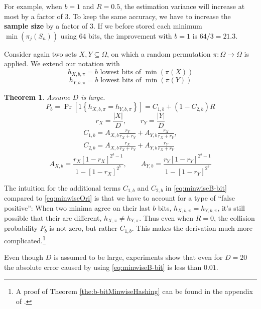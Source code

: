 \documentclass[a4paper]{article}
\newtheorem{mytheorem}{Theorem}
\begin{document}
For example, when $b=1$ and $R=0.5$, the estimation variance will increase at most by a factor of $3$. To keep the same accuracy, we have to increase the \textbf{sample size} by a factor of $3$. If we before stored each minimum $\min(\pi_j(S_n))$ using $64$ bits, the improvement with $b=1$ is $64/3=21.3$.

Consider again two sets $X,Y \subseteq \Omega$, on which a random permutation $\pi: \Omega \longrightarrow \Omega$ is applied. We extend our notation with
\[
h_{X,b,\pi}=b \text{ lowest bits of } \min(\pi(X))
\]
\[
h_{Y,b,\pi}=b \text{ lowest bits of } \min(\pi(Y))
\]
\begin{framed}
\begin{mytheorem} \label{the:b-bitMinwiseHashing}
Assume $D$ is large.
\begin{equation}\label{eq:minwiseB-bit}
P_b=\Pr[1\left\lbrace h_{X,b,\pi}=h_{Y,b,\pi}\right\rbrace]=C_{1,b}+(1-C_{2,b})R
\end{equation}
\begin{equation}
r_X=\frac{|X|}{D}, \qquad r_Y=\frac{|Y|}{D}
\end{equation}
\begin{equation}
\begin{split}
C_{1,b}=A_{X,b}\frac{r_Y}{r_X+r_Y}+A_{Y,b}\frac{r_X}{r_X+r_Y},\\
C_{2,b}=A_{X,b}\frac{r_X}{r_X+r_Y}+A_{Y,b}\frac{r_Y}{r_X+r_Y}
\end{split}
\end{equation}
\begin{equation}
A_{X,b}=\frac{r_X[1-r_X]^{2^b-1}}{1-[1-r_X]^{2^b}}, \qquad A_{Y,b}=\frac{r_Y[1-r_Y]^{2^b-1}}{1-[1-r_Y]^{2^b}}
\end{equation}
\end{mytheorem}
\end{framed}

The intuition for the additional terms $C_{1,b}$ and $C_{2,b}$ in \vref{eq:minwiseB-bit} compared to \vref{eq:minwiseOri} is that we have to account for a type of ``false positive'': When two minima agree on their last $b$ bits, $h_{X,b,\pi}=h_{Y,b,\pi}$, it's still possible that their are different, $h_{X,\pi}\neq h_{Y,\pi}$. Thus even when $R=0$, the collision probability $P_b$ is not zero, but rather $C_{1,b}$. This makes the derivation much more complicated.\footnote{A proof of Theorem \vref{the:b-bitMinwiseHashing} can be found in the appendix of \citep{LiK09}.}

Even though $D$ is assumed to be large, experiments show that even for $D=20$ the absolute error caused by using \vref{eq:minwiseB-bit} is less than $0.01$.
\end{document}
